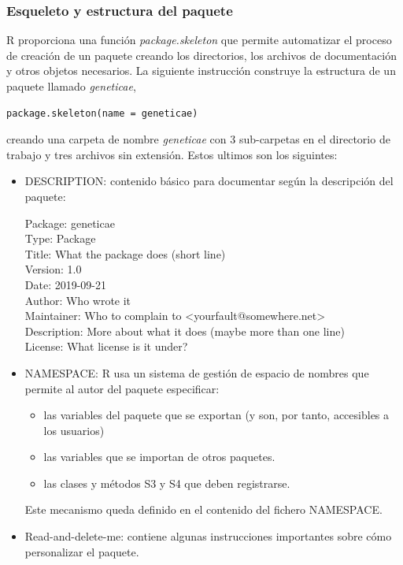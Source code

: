 \subsubsection{Esqueleto y estructura del paquete}
R proporciona una función \emph{package.skeleton} que permite automatizar el proceso de creación de un paquete creando los directorios, los archivos de documentación y otros objetos necesarios.
La  siguiente instrucción construye la estructura de un paquete llamado \emph{geneticae}, 

\begin{lstlisting}[frame=single]
package.skeleton(name = geneticae)
\end{lstlisting}

creando una carpeta de nombre \emph{geneticae} con 3 sub-carpetas en el directorio de trabajo y tres archivos sin extensión. Estos ultimos son los siguintes: 
\begin{itemize}

\item DESCRIPTION: contenido básico para
documentar según la descripción del paquete:

Package: geneticae\\
Type: Package\\
Title: What the package does (short line)\\
Version: 1.0\\
Date: 2019-09-21\\
Author: Who wrote it\\
Maintainer: Who to complain to <yourfault@somewhere.net>\\
Description: More about what it does (maybe more than one line)\\
License: What license is it under?\\

\item NAMESPACE: R usa un sistema de gestión de espacio de nombres que permite al autor del paquete especificar:
\begin{itemize}
\item las variables del paquete que se exportan (y son, por tanto, accesibles a los usuarios)
\item las variables que se importan de otros paquetes.
\item las clases y métodos S3 y S4 que deben registrarse.
\end{itemize}

Este mecanismo queda definido en el contenido del fichero NAMESPACE.

\item Read-and-delete-me: contiene algunas instrucciones importantes sobre cómo personalizar el paquete.
\end{itemize}

